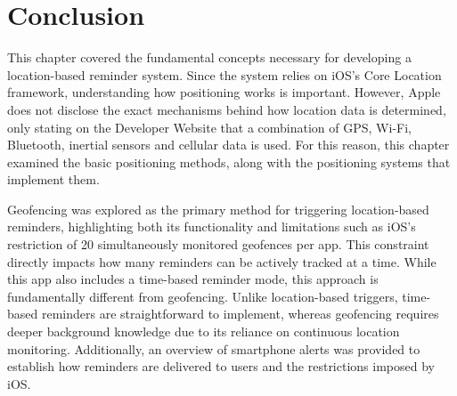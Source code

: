 \section{Conclusion}
This chapter covered the fundamental concepts necessary for developing a location-based reminder system. 
Since the system relies on iOS's Core Location framework, understanding how positioning works is important. 
However, Apple does not disclose the exact mechanisms behind how location data is determined, only stating on the Developer Website \cite{apple_corelocation} that a combination of GPS, Wi-Fi, Bluetooth, inertial sensors and cellular data is used. 
For this reason, this chapter examined the basic positioning methods, along with the positioning systems that implement them.

Geofencing was explored as the primary method for triggering location-based reminders, highlighting both its functionality and limitations such as iOS's restriction of 20 simultaneously monitored geofences per app. 
This constraint directly impacts how many reminders can be actively tracked at a time.
While this app also includes a time-based reminder mode, this approach is fundamentally different from geofencing. 
Unlike location-based triggers, time-based reminders are straightforward to implement, whereas geofencing requires deeper background knowledge due to its reliance on continuous location monitoring.
Additionally, an overview of smartphone alerts was provided to establish how reminders are delivered to users and the restrictions imposed by iOS.
